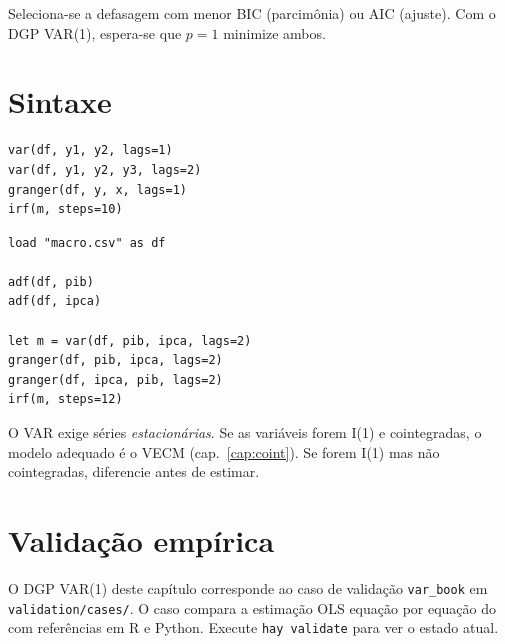 Seleciona-se a defasagem com menor BIC (parcimônia) ou AIC (ajuste).
Com o DGP VAR(1), espera-se que $p=1$ minimize ambos.

\section{Sintaxe}

\begin{lstlisting}
var(df, y1, y2, lags=1)
var(df, y1, y2, y3, lags=2)
granger(df, y, x, lags=1)
irf(m, steps=10)
\end{lstlisting}

\begin{lstlisting}[caption={Fluxo típico — PIB e inflação}]
load "macro.csv" as df

adf(df, pib)
adf(df, ipca)

let m = var(df, pib, ipca, lags=2)
granger(df, pib, ipca, lags=2)
granger(df, ipca, pib, lags=2)
irf(m, steps=12)
\end{lstlisting}

\begin{nota}
  O VAR exige séries \emph{estacionárias}. Se as variáveis forem I(1) e
  cointegradas, o modelo adequado é o VECM (cap.~\ref{cap:coint}). Se
  forem I(1) mas não cointegradas, diferencie antes de estimar.
\end{nota}

\section{Validação empírica}

O DGP VAR(1) deste capítulo corresponde ao caso de validação
\texttt{var\_book} em \texttt{validation/cases/}. O caso compara a estimação
OLS equação por equação do \hayashi{} com referências em R e Python. Execute
\lstinline{hay validate} para ver o estado atual.
